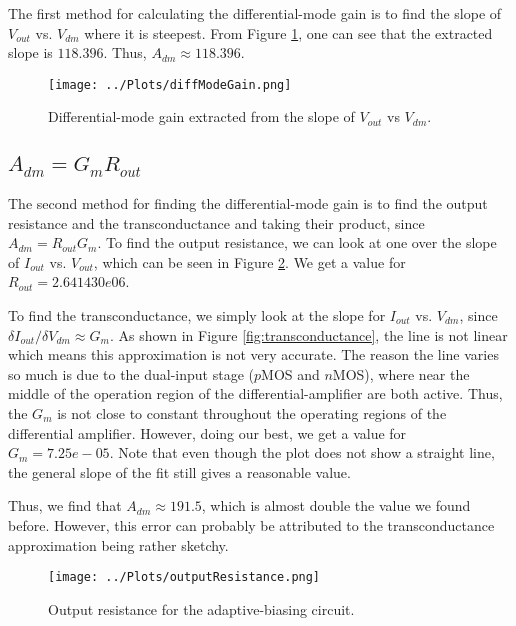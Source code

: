 \documentclass{article}
\begin{document}
        The first method for calculating the differential-mode gain is to find the slope of $V_{out}$ vs. $V_{dm}$ where it is steepest. From Figure \ref{fig:diffModeGain}, one can see that the extracted slope is $118.396$. Thus, $A_{dm} \approx 118.396$.

        \begin{figure}[h]
            \centering
            \texttt{[image: ../Plots/diffModeGain.png]}
            \caption{Differential-mode gain extracted from the slope of $V_{out}$ vs $V_{dm}$.}
            \label{fig:diffModeGain}
        \end{figure}


    \subsection{$A_{dm} = G_{m}R_{out}$}
        The second method for finding the differential-mode gain is to find the output resistance and the transconductance and taking their product, since $A_{dm} = R_{out}G_{m}$. To find the output resistance, we can look at one over the slope of $I_{out}$ vs. $V_{out}$, which can be seen in Figure \ref{fig:outputRes}. We get a value for $R_{out} = 2.641430e06$.

        To find the transconductance, we simply look at the slope for $I_{out}$ vs. $V_{dm}$, since $\delta I_{out} / \delta V_{dm} \approx G_{m}$. As shown in Figure \ref{fig:transconductance}, the line is not linear which means this approximation is not very accurate. The reason the line varies so much is due to the dual-input stage ($p$MOS and $n$MOS), where near the middle of the operation region of the differential-amplifier are both active. Thus, the $G_{m}$ is not close to constant throughout the operating regions of the differential amplifier. However, doing our best, we get a value for $G_{m} = 7.25e-05$. Note that even though the plot does not show a straight line, the general slope of the fit still gives a reasonable value.

        Thus, we find that $A_{dm} \approx 191.5$, which is almost double the value we found before. However, this error can probably be attributed to the transconductance approximation being rather sketchy.

        \begin{figure}[h!]
            \centering
            \texttt{[image: ../Plots/outputResistance.png]}
            \caption{Output resistance for the adaptive-biasing circuit.}
            \label{fig:outputRes}
        \end{figure}
\end{document}
